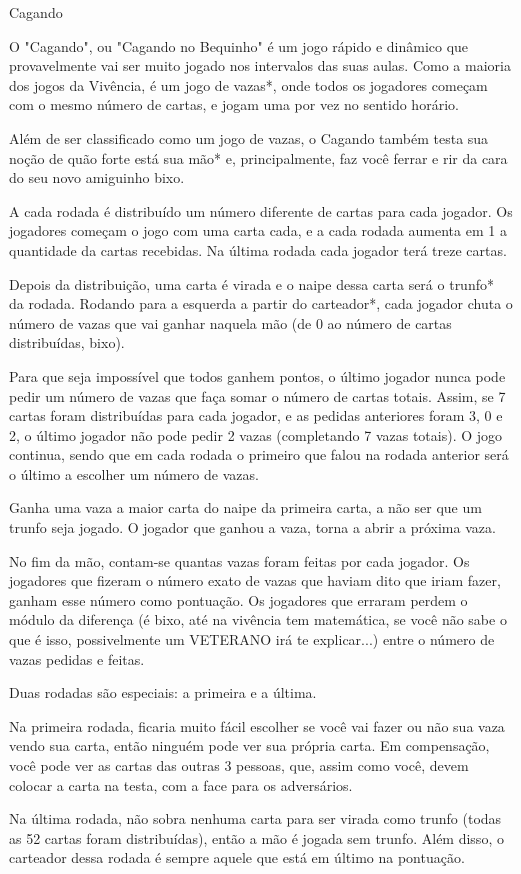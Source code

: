\begin{subsecao}{Cagando}

O "Cagando", ou "Cagando no Bequinho" é um jogo rápido e dinâmico que
provavelmente vai ser muito jogado nos intervalos das suas aulas. Como a
maioria dos jogos da Vivência, é um jogo de vazas*, onde todos os jogadores
começam com o mesmo número de cartas, e jogam uma por vez no sentido horário. 

Além de ser classificado como um jogo de vazas, o Cagando também testa sua
noção de quão forte está sua mão* e, principalmente, faz você ferrar e rir da
cara do seu novo amiguinho bixo. 

A cada rodada é distribuído um número diferente de cartas para cada jogador. Os
jogadores começam o jogo com uma carta cada, e a cada rodada aumenta em 1 a
quantidade da cartas recebidas. Na última rodada cada jogador terá treze cartas. 

Depois da distribuição, uma carta é virada e o naipe dessa carta será o trunfo*
da rodada. Rodando para a esquerda a partir do carteador*, cada jogador chuta o
número de vazas que vai ganhar naquela mão (de 0 ao número de cartas
distribuídas, bixo). 

Para que seja impossível que todos ganhem pontos, o último jogador nunca pode
pedir um número de vazas que faça somar o número de cartas totais. Assim, se 7
cartas foram distribuídas para cada jogador, e as pedidas anteriores foram 3, 0
e 2, o último jogador não pode pedir 2 vazas (completando 7 vazas totais). O
jogo continua, sendo que em cada rodada o primeiro que falou na rodada anterior
será o último a escolher um número de vazas. 

Ganha uma vaza a maior carta do naipe da primeira carta, a não ser que um
trunfo seja jogado. O jogador que ganhou a vaza, torna a abrir a próxima vaza. 

No fim da mão, contam-se quantas vazas foram feitas por cada jogador. Os
jogadores que fizeram o número exato de vazas que haviam dito que iriam fazer,
ganham esse número como pontuação. Os jogadores que erraram perdem o módulo da
diferença (é bixo, até na vivência tem matemática, se você não sabe o que é
isso, possivelmente um VETERANO irá te explicar...) entre o número de
vazas pedidas e feitas. 

Duas rodadas são especiais: a primeira e a última. 

Na primeira rodada, ficaria muito fácil escolher se você vai fazer ou não sua
vaza vendo sua carta, então ninguém pode ver sua própria carta. Em compensação,
você pode ver as cartas das outras 3 pessoas, que, assim como você, devem
colocar a carta na testa, com a face para os adversários. 

Na última rodada, não sobra nenhuma carta para ser virada como trunfo (todas
as 52 cartas foram distribuídas), então a mão é jogada sem trunfo. Além disso,
o carteador dessa rodada é sempre aquele que está em último na pontuação.

\end{subsecao}
